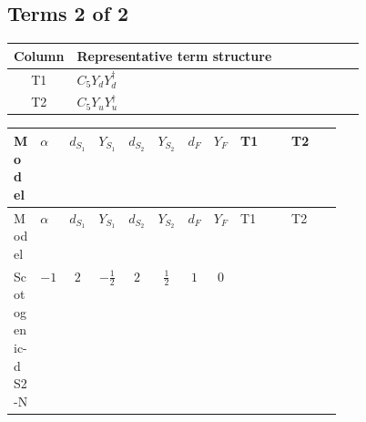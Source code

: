 \documentclass[8pt]{article}
\begin{document}
\begin{landscape}
\subsection*{Terms 2 of 2}
\begin{center}
\begin{tabular}{@{}c >{\raggedright\arraybackslash}p{0.82\linewidth}@{}}
\toprule
Column & Representative term structure \\
\midrule
T1 & \(\displaystyle C_{5} Y_d Y_d^\dagger\) \\
\midrule
T2 & \(\displaystyle C_{5} Y_u Y_u^\dagger\) \\
\midrule
\bottomrule
\end{tabular}
\end{center}
\smallskip
\tiny
\begin{longtable}{@{}llcccccc >{\raggedright\arraybackslash}p{0.21\linewidth} >{\raggedright\arraybackslash}p{0.21\linewidth}@{}}
\toprule
Model & $\alpha$ & $d_{S_1}$ & $Y_{S_1}$ & $d_{S_2}$ & $Y_{S_2}$ & $d_F$ & $Y_F$ & T1 & T2 \\
\midrule
\endfirsthead
\toprule
Model & $\alpha$ & $d_{S_1}$ & $Y_{S_1}$ & $d_{S_2}$ & $Y_{S_2}$ & $d_F$ & $Y_F$ & T1 & T2 \\
\midrule
\endhead
Scotogenic-dS2-N & $-1$ & $2$ & $-\frac{1}{2}$ & $2$ & $\frac{1}{2}$ & $1$ & $0$ & \scriptsize\adjustbox{max width=\linewidth}{$\begin{gathered} 6 C_{5} Y_d Y_d^\dagger\end{gathered}$} & \scriptsize\adjustbox{max width=\linewidth}{$\begin{gathered} 6 C_{5} Y_u Y_u^\dagger\end{gathered}$} \\
\midrule
\bottomrule
\end{longtable}
\end{landscape}
\end{document}
